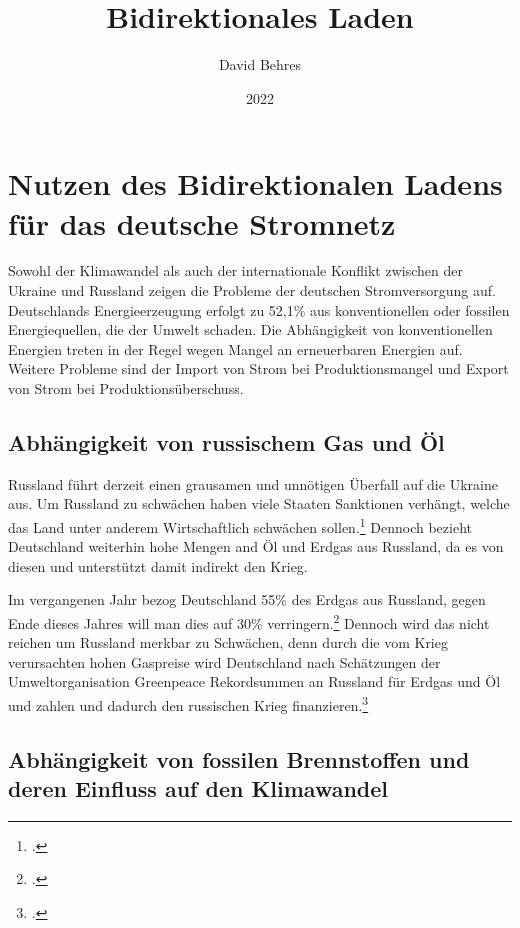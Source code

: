 \documentclass[12pt]{article}
\title{Bidirektionales Laden}
\author{David Behres}
\date{2022}
\begin{document}
    \tableofcontents
    \pagebreak


    \section{Nutzen des Bidirektionalen Ladens für das deutsche Stromnetz}



    Sowohl der Klimawandel als auch der internationale Konflikt zwischen der Ukraine und Russland
    zeigen die Probleme der deutschen Stromversorgung auf.
    Deutschlands Energieerzeugung erfolgt zu 52,1\% aus konventionellen oder fossilen Energiequellen, die der Umwelt
    schaden.
    Die Abhängigkeit von konventionellen Energien treten in der Regel wegen Mangel an erneuerbaren Energien auf.
    Weitere Probleme sind der Import von Strom bei Produktionsmangel und Export von Strom bei Produktionsüberschuss.

    \subsection{Abhängigkeit von russischem Gas und Öl} \label{subsec:putin}
    Russland führt derzeit einen grausamen und unnötigen Überfall auf die Ukraine aus.
    Um Russland zu schwächen haben viele Staaten Sanktionen verhängt, welche das Land unter anderem
    Wirtschaftlich schwächen sollen.\footcite{SanktionenGegenRussland2022}
    Dennoch bezieht Deutschland weiterhin hohe Mengen and Öl und Erdgas aus Russland, da es von diesen und
    unterstützt damit indirekt den Krieg.

    Im vergangenen Jahr bezog Deutschland 55\% des Erdgas aus Russland, gegen Ende dieses Jahres will man dies auf
    30\% verringern.\footcite{wdraktuellFAQWasGasLieferstopp} Dennoch wird das nicht reichen um Russland merkbar zu
    Schwächen, denn durch die vom Krieg verursachten hohen Gaspreise wird Deutschland nach Schätzungen der
    Umweltorganisation Greenpeace Rekordsummen an Russland für Erdgas und Öl und zahlen und dadurch den russischen
    Krieg finanzieren.\footcite{balserOlUndGas}

    \subsection{Abhängigkeit von fossilen Brennstoffen und deren Einfluss auf den Klimawandel}
\end{document}
